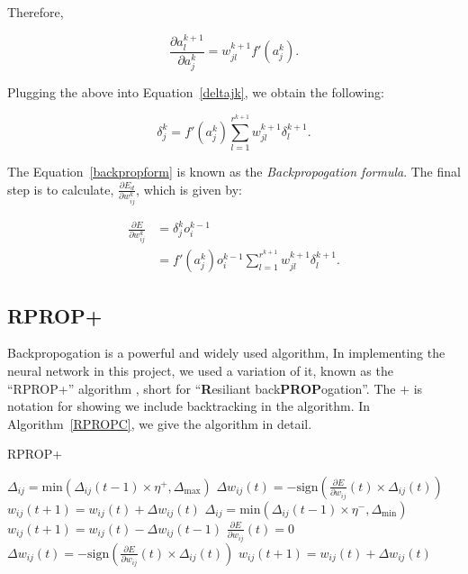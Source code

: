 Therefore,

\begin{equation}
    \frac{\partial a_l^{k+1}}{\partial a_j^k} = w_{jl}^{k+1}f'(a_j^k).
\end{equation}

Plugging the above into Equation~\ref{deltajk}, we obtain the following:

\begin{equation}
    \label{backpropform}
    \delta_j^k = f'(a_j^k)\sum^{r^{k+1}}_{l=1}w_{jl}^{k+1}\delta_l^{k+1}.
\end{equation}

The Equation~\ref{backpropform} is known as the \textit{Backpropogation formula}. The final step is to calculate, $\frac{\partial E_d}{\partial w_{ij}^k}$, which is given by:

\begin{align}
        \frac{\partial E}{\partial w_{ij}^k} &= \delta^k_jo_i^{k-1} \\
        &=f'(a_j^k)o^{k-1}_i \sum^{r^{k+1}}_{l=1}w_{jl}^{k+1}\delta_l^{k+1}.
\end{align}

\subsection{RPROP+}
Backpropogation is a powerful and widely used algorithm, In implementing the neural network in this project, we used a variation of it, known as 
the ``RPROP+'' algorithm \newline 
\cite{rprop}, short for ``\textbf{R}esiliant back\textbf{PROP}ogation''. The $+$ is notation for showing we include backtracking in the algorithm. In Algorithm~\ref{RPROPC}, 
we give the algorithm in detail. 

\begin{algorithm}[h]
    \caption{RPROP+}\label{RPROPC}
\begin{algorithmic}[1]
    \State $\Delta_{ij} = \text{min} (\Delta_{ij}(t-1)\times \eta^{+},\Delta_{\text{max}})$ 
    \State $\Delta w_{ij}(t) = -\text{sign}\left(\frac{\partial E}{\partial w_{ij}}(t) \times \Delta_{ij}(t)\right)$
    \State $w_{ij}(t+1) = w_{ij}(t) + \Delta w_{ij}(t)$
    \State $\Delta_{ij} = \text{min} (\Delta_{ij}(t-1)\times \eta^{-},\Delta_{\text{min}})$ 
    \State $w_{ij}(t+1) = w_{ij}(t) - \Delta w_{ij}(t-1)$
    \State $\frac{\partial E}{\partial w_{ij}}(t) = 0 $
    \State $\Delta w_{ij}(t) = -\text{sign}\left(\frac{\partial E}{\partial w_{ij}}(t) \times \Delta_{ij}(t)\right)$
    \State $w_{ij}(t+1) = w_{ij}(t) + \Delta w_{ij}(t)$
\EndIf
\EndFor
\end{algorithmic}   
\end{algorithm}

